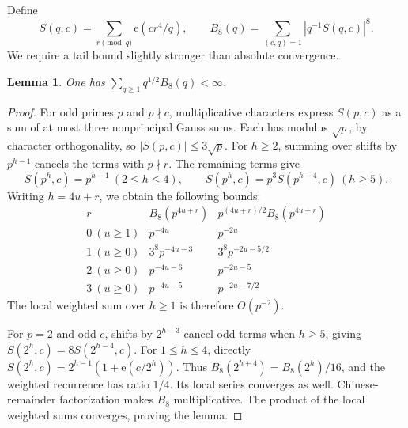 \documentclass[11pt]{article}
\newtheorem{lemma}{Lemma}
\theoremstyle{remark}\newtheorem*{remark}{Remark}
\newcommand{\e}{\mathrm e}
\begin{document}
Define
\[
 S(q,c)=\sum_{r\pmod q}\e(cr^4/q),\qquad
 B_8(q)=\sum_{(c,q)=1}|q^{-1}S(q,c)|^8.
\]
We require a tail bound slightly stronger than absolute convergence.
\begin{lemma}\label{lem:tails}
One has \(\sum_{q\ge1}q^{1/2}B_8(q)<\infty\).
\end{lemma}
\begin{proof}
For odd primes \(p\) and \(p\nmid c\), multiplicative characters
express \(S(p,c)\) as a sum of at most three nonprincipal Gauss sums.
Each has modulus \(\sqrt p\), by character orthogonality, so
\(|S(p,c)|\le3\sqrt p\).
For \(h\ge2\), summing over shifts by \(p^{h-1}\) cancels the
terms with \(p\nmid r\). The remaining terms give
\[
 S(p^h,c)=p^{h-1}\ (2\le h\le4),\qquad
 S(p^h,c)=p^3S(p^{h-4},c)\ (h\ge5).
\]
Writing \(h=4u+r\), we obtain the following bounds:
\[
\begin{array}{c|c|c}
 r& B_8(p^{4u+r})&p^{(4u+r)/2}B_8(p^{4u+r})\\\hline
 0\ (u\ge1)&p^{-4u}&p^{-2u}\\
 1\ (u\ge0)&3^8p^{-4u-3}&3^8p^{-2u-5/2}\\
 2\ (u\ge0)&p^{-4u-6}&p^{-2u-5}\\
 3\ (u\ge0)&p^{-4u-5}&p^{-2u-7/2}
\end{array}
\]
The local weighted sum over \(h\ge1\) is therefore \(O(p^{-2})\).

For \(p=2\) and odd \(c\), shifts by \(2^{h-3}\) cancel odd
terms when \(h\ge5\), giving
\(S(2^h,c)=8S(2^{h-4},c)\).
For \(1\le h\le4\), directly
\(S(2^h,c)=2^{h-1}(1+\e(c/2^h))\).
Thus \(B_8(2^{h+4})=B_8(2^h)/16\), and the weighted recurrence
has ratio \(1/4\). Its local series converges as well.
Chinese-remainder factorization makes \(B_8\) multiplicative.
The product of the local weighted sums converges, proving the lemma.
\end{proof}
\end{document}
